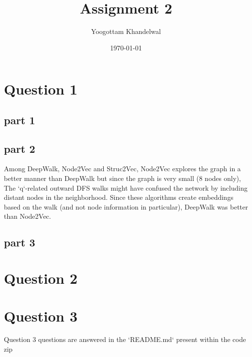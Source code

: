 \documentclass[11pt]{article}
\author{Yoogottam Khandelwal}
\date{\today}
\title{Assignment 2}
\begin{document}
\maketitle

\section{Question 1}
\label{sec:org102f1d4}
\subsection{part 1}
\label{sec:orge5eb16b}
\subsection{part 2}
\label{sec:orgc206b7e}
Among DeepWalk, Node2Vec and Struc2Vec, Node2Vec explores the graph in a better manner than DeepWalk but since the graph is very small (8 nodes only), The `q`-related outward DFS walks might have confused the network by including distant nodes in the neighborhood. Since these algorithms create embeddings based on the walk (and not node information in particular), DeepWalk was better than Node2Vec.
\subsection{part 3}
\label{sec:org114a8d4}

\section{Question 2}
\label{sec:org5484b1e}

\section{Question 3}
\label{sec:org70ddbb8}
Question 3 questions are answered in the `README.md` present within the code zip
\end{document}
